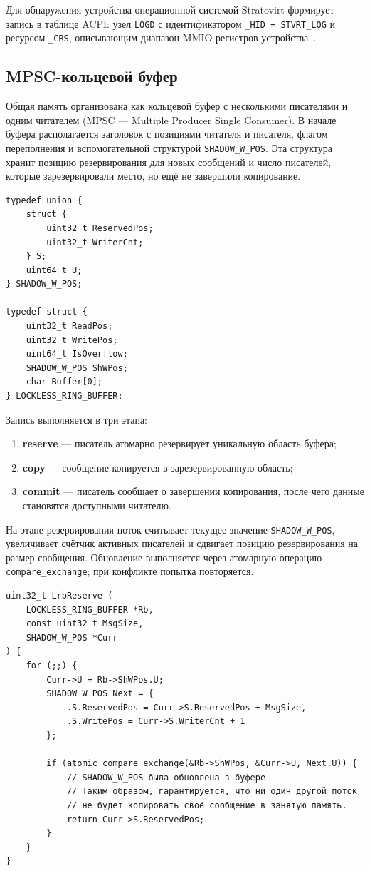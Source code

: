 Для обнаружения устройства операционной системой Stratovirt формирует запись в
таблице ACPI: узел \texttt{LOGD} с идентификатором
\texttt{\_HID = STVRT\_LOG} и ресурсом \texttt{\_CRS}, описывающим диапазон
MMIO-регистров устройства~\cite{acpi_spec}.

\subsection{MPSC-кольцевой буфер}
\label{sec:ch2-ring-buffer}

Общая память организована как кольцевой буфер с несколькими писателями и одним
читателем (MPSC --- Multiple Producer Single Consumer). В
начале буфера располагается заголовок с позициями читателя и писателя, флагом
переполнения и вспомогательной структурой \texttt{SHADOW\_W\_POS}. Эта структура
хранит позицию резервирования для новых сообщений и число писателей, которые
зарезервировали место, но ещё не завершили копирование.

\begin{lstlisting}
typedef union {
    struct {
        uint32_t ReservedPos;
        uint32_t WriterCnt;
    } S;
    uint64_t U;
} SHADOW_W_POS;

typedef struct {
    uint32_t ReadPos;
    uint32_t WritePos;
    uint64_t IsOverflow;
    SHADOW_W_POS ShWPos;
    char Buffer[0];
} LOCKLESS_RING_BUFFER;
\end{lstlisting}

Запись выполняется в три этапа:
\begin{enumerate}
    \item \textbf{reserve} --- писатель атомарно резервирует уникальную область
    буфера;
    \item \textbf{copy} --- сообщение копируется в зарезервированную область;
    \item \textbf{commit} --- писатель сообщает о завершении копирования, после
    чего данные становятся доступными читателю.
\end{enumerate}

На этапе резервирования поток считывает текущее значение
\texttt{SHADOW\_W\_POS}, увеличивает счётчик активных писателей и сдвигает
позицию резервирования на размер сообщения. Обновление выполняется через
атомарную операцию \texttt{compare\_exchange}; при конфликте попытка
повторяется.

\begin{lstlisting}
uint32_t LrbReserve (
    LOCKLESS_RING_BUFFER *Rb,
    const uint32_t MsgSize,
    SHADOW_W_POS *Curr
) {
    for (;;) {
        Curr->U = Rb->ShWPos.U;
        SHADOW_W_POS Next = {
            .S.ReservedPos = Curr->S.ReservedPos + MsgSize,
            .S.WritePos = Curr->S.WriterCnt + 1
        };

        if (atomic_compare_exchange(&Rb->ShWPos, &Curr->U, Next.U)) {
            // SHADOW_W_POS была обновлена в буфере
            // Таким образом, гарантируется, что ни один другой поток
            // не будет копировать своё сообщение в занятую память.
            return Curr->S.ReservedPos;
        }
    }
}
\end{lstlisting}

